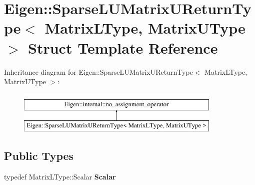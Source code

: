 \hypertarget{struct_eigen_1_1_sparse_l_u_matrix_u_return_type}{}\section{Eigen\+::Sparse\+L\+U\+Matrix\+U\+Return\+Type$<$ Matrix\+L\+Type, Matrix\+U\+Type $>$ Struct Template Reference}
\label{struct_eigen_1_1_sparse_l_u_matrix_u_return_type}
Inheritance diagram for Eigen\+::Sparse\+L\+U\+Matrix\+U\+Return\+Type$<$ Matrix\+L\+Type, Matrix\+U\+Type $>$\+:\begin{figure}[H]
\begin{center}
\leavevmode
\includegraphics[height=2.000000cm]{struct_eigen_1_1_sparse_l_u_matrix_u_return_type}
\end{center}
\end{figure}
\subsection*{Public Types}
\begin{DoxyCompactItemize}
\item 
\mbox{\label{struct_eigen_1_1_sparse_l_u_matrix_u_return_type_add90da2111178ef9261c229bb6c788c0}} 
typedef Matrix\+L\+Type\+::\+Scalar {\bfseries Scalar}
\end{DoxyCompactItemize}
